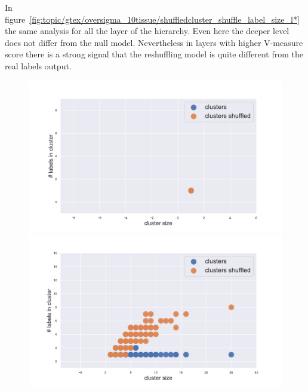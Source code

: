 In figure~\ref{fig:topic/gtex/oversigma_10tissue/shuffledcluster_shuffle_label_size_l*} the same analysis for all the layer of the hierarchy. Even here the deeper level does not differ from the null model. Nevertheless in layers with higher V-measure score there is a strong signal that the reshuffling model is quite different from the real labels output.
\begin{figure}[htb!]
    \centering
    \begin{minipage}{0.45\textwidth}
    \includegraphics[width=0.9\linewidth]{pictures/topic/gtex/oversigma_10tissue/shuffledcluster_shuffle_label_size_l0_primary_site.pdf}
    \end{minipage}
    \hspace{3mm}
    \begin{minipage}{0.45\textwidth}
    \includegraphics[width=0.9\linewidth]{pictures/topic/gtex/oversigma_10tissue/shuffledcluster_shuffle_label_size_l1_primary_site.pdf}
    \end{minipage}
    \\
    \begin{minipage}{0.45\textwidth}

\end{minipage}
\end{figure}
